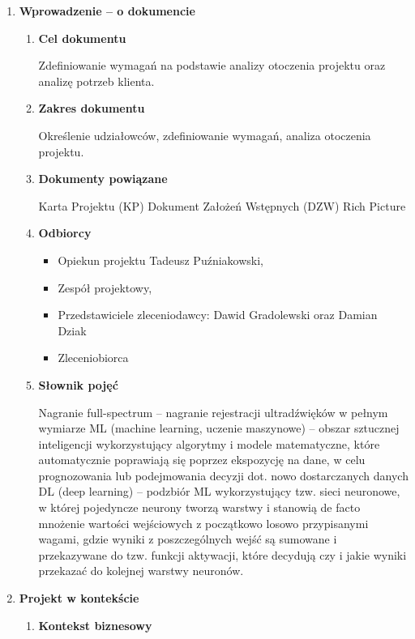 \documentclass{sprz}
\begin{document}
\begin{enumerate}[label=\textbf{\arabic*}.]
  \item \textbf{Wprowadzenie – o dokumencie}
    \begin{enumerate}[font=\bfseries]
      \item \textbf{Cel dokumentu}
      
        Zdefiniowanie wymagań na podstawie analizy otoczenia projektu oraz analizę potrzeb klienta.

      \item \textbf{Zakres dokumentu}
      
        Określenie udziałowców, zdefiniowanie wymagań, analiza otoczenia projektu.

      \item \textbf{Dokumenty powiązane}
      
        Karta Projektu (KP)
        Dokument Założeń Wstępnych (DZW)
        Rich Picture

      \item \textbf{Odbiorcy}
      
        \begin{itemize}
          \item Opiekun projektu Tadeusz Puźniakowski,
          \item Zespół projektowy,
          \item Przedstawiciele zleceniodawcy: Dawid Gradolewski oraz Damian Dziak
          \item Zleceniobiorca
        \end{itemize}  

      \item \textbf{Słownik pojęć}
      
        Nagranie full-spectrum – nagranie rejestracji ultradźwięków w pełnym wymiarze
        ML (machine learning, uczenie maszynowe) – obszar sztucznej inteligencji wykorzystujący algorytmy i modele matematyczne, które automatycznie poprawiają się poprzez ekspozycję na dane, w celu prognozowania lub podejmowania decyzji dot. nowo dostarczanych danych 
        DL (deep learning) – podzbiór ML wykorzystujący tzw. sieci neuronowe, w której pojedyncze neurony tworzą warstwy i stanowią de facto mnożenie wartości wejściowych z początkowo losowo przypisanymi wagami, gdzie wyniki z poszczególnych wejść są sumowane i przekazywane do tzw. funkcji aktywacji, które decydują czy i jakie wyniki przekazać do kolejnej warstwy neuronów.      

    \end{enumerate}
  \item \textbf{Projekt w kontekście}
    \begin{enumerate}[font=\bfseries]
      \item \textbf{Kontekst biznesowy}
      

\end{enumerate}
\end{enumerate}
\end{document}

